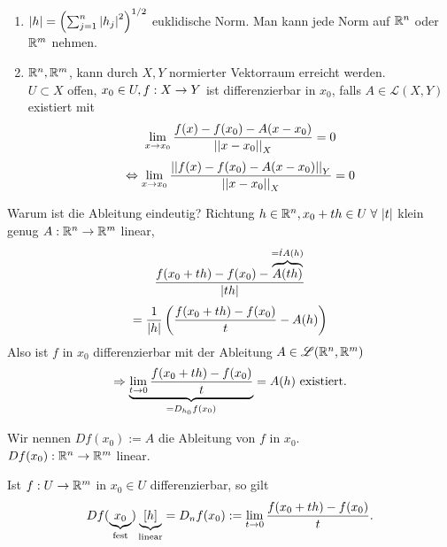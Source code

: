 \documentclass[../ana2.tex]{subfiles}
\begin{document}
\begin{bem}
    \begin{enumerate}
        \item \( \left|h\right| = \left( \sum_{j=1}^n \left|h_j\right|^2 \right)^{1/2} \) 
        euklidische Norm. Man kann jede Norm auf \( \mathbb{R}^n \) oder 
        \( \mathbb{R}^m \) nehmen.
        \item \( \mathbb{R}^n, \mathbb{R}^m \), kann durch \(X, Y\) 
        normierter Vektorraum erreicht werden. \\
        \( U \subset X \) offen, \( x_0 \in U, f:X\rightarrow Y \) ist
        differenzierbar in \(x_0\), falls \(A \in \mathscr{L}(X, Y) \)
        existiert mit
        \[ \lim\limits_{x\rightarrow{}x_0} \frac{f(x)-f(x_0)-A(x-x_0)}{\left|\left|x-x_0\right|\right|_X} = 0 \]
        \[ \Leftrightarrow \lim\limits_{x\rightarrow{}x_0} 
        \frac{\left|\left|f(x)-f(x_0)-A(x-x_0)\right|\right|_Y}{\left|\left|x-x_0\right|\right|_X} = 0 \]
    \end{enumerate}
    Warum ist die Ableitung eindeutig? 
    Richtung \( h \in \R^n, x_0 + th \in U 
    \;\forall \abs{t} \) klein genug
    \( A:\mathbb{R}^n\rightarrow \mathbb{R}^m \) linear, 
    \[ \frac{ f(x_0 + th) - f(x_0) - 
    \overbrace{A(th)}^{=\dot{t} A(h)} }{ \left|th\right| }\]
    \[ = \frac{1}{\left|h\right|} 
    \left( \frac{f(x_0 + th) - f(x_0)}{t} - A(h) \right) \]
    Also ist \( f \) in \( x_0 \) differenzierbar 
    mit der Ableitung \( A \in \mathscr{L}(\mathbb{R}^n, \mathbb{R}^m) \)    
    \[ \Rightarrow \underbrace{\lim\limits_{t\rightarrow{}0} \frac{f(x_0+th) 
    - f(x_0)}{t}}_{= D_{h_0}f(x_0)} = A(h) 
    \text{ existiert.} \]
\end{bem}
\begin{notation}
    Wir nennen \( D f(x_0) := A \) die 
    Ableitung von \(f\) in \(x_0\).\\
    \( Df(x_0):\mathbb{R}^n\rightarrow \mathbb{R}^m \) linear.
\end{notation}
\begin{satz}
    Ist \( f:U\rightarrow \mathbb{R}^m \) in \( x_0 \in U \)
    differenzierbar, so gilt 
    \[ Df(\underbrace{x_0}_{\text{fest}})\underbrace{[h]}_{\text{linear}} 
    = D_n f(x_0) 
    := \lim\limits_{t\rightarrow{}0} \frac{f(x_0 + th) - f(x_0)}{t}. \]
\end{satz}
\end{document}
